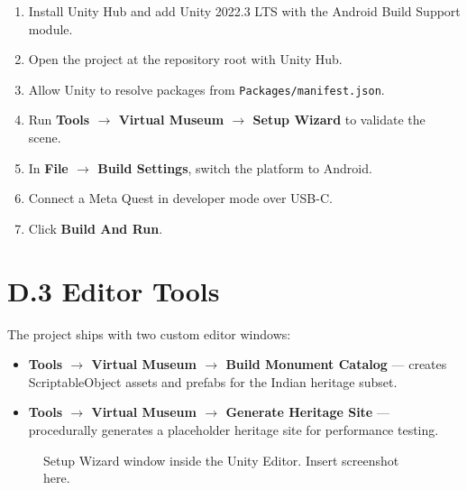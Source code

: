 \begin{enumerate}
\item Install Unity Hub and add Unity 2022.3 LTS with the Android Build Support module.
\item Open the project at the repository root with Unity Hub.
\item Allow Unity to resolve packages from \texttt{Packages/manifest.json}.
\item Run \textbf{Tools $\rightarrow$ Virtual Museum $\rightarrow$ Setup Wizard} to validate the scene.
\item In \textbf{File $\rightarrow$ Build Settings}, switch the platform to Android.
\item Connect a Meta Quest in developer mode over USB-C.
\item Click \textbf{Build And Run}.
\end{enumerate}

\section*{D.3 Editor Tools}

The project ships with two custom editor windows:

\begin{itemize}
\item \textbf{Tools $\rightarrow$ Virtual Museum $\rightarrow$ Build Monument Catalog} --- creates ScriptableObject assets and prefabs for the Indian heritage subset.
\item \textbf{Tools $\rightarrow$ Virtual Museum $\rightarrow$ Generate Heritage Site} --- procedurally generates a placeholder heritage site for performance testing.
\end{itemize}

\begin{figure}[h]
\centering
\fbox{\rule{0pt}{7cm}\rule{0.85\textwidth}{0pt}}
\caption{Setup Wizard window inside the Unity Editor. Insert screenshot here.}
\label{fig:wizard}
\end{figure}
